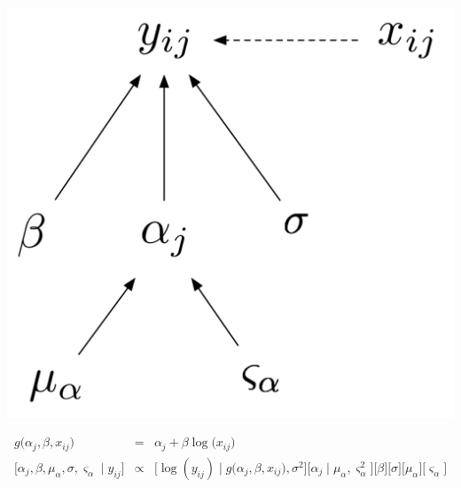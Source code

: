 \documentclass[12pt, oneside]{article}
\newif\ifanswers
\begin{document}
\begin{enumerate} [leftmargin=*]
\ifanswers
\newpage
\begin{center}
\includegraphics[scale=.5]{DAG2.png}
\end{center}

\begin{eqnarray*}
g\big(\alpha_{j},\beta,x_{ij}\big)&=& \alpha_{j}+\beta\log\big(x_{ij}\big)\\
\big[\alpha_{j},\beta,\mu_{\alpha},\sigma,\varsigma_{\alpha}\mid y_{ij}\big] & \propto & \big[\log(y_{ij})\mid g\big(\alpha_{j},\beta,x_{ij}\big),\sigma^{2}\big]\big[\alpha_{j}\mid\mu_{\alpha},\varsigma_{\alpha}^{2}\big]\big[\beta\big]\big[\sigma\big]\big[\mu_{\alpha}\big]\big[\varsigma_{\alpha}\big]\label{eq:mean model for N02 intecept}
\end{eqnarray*}


\end{enumerate}
\end{document}
